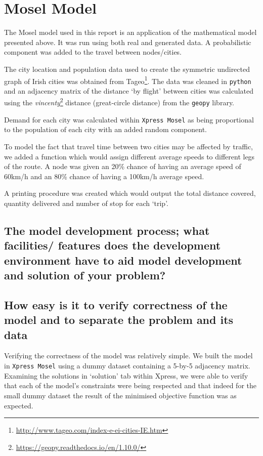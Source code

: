 \documentclass[a4paper,11pt]{article}
\begin{document}
\section{Mosel Model}

The Mosel model used in this report is an application of the mathematical model presented above. It was run using both real and generated data. A probabilistic component was added to the travel between nodes/cities.

The city location and population data used to create the symmetric undirected graph of Irish cities was obtained from Tageo\footnote{\url{http://www.tageo.com/index-e-ei-cities-IE.htm}}. The data was cleaned in \texttt{python} and an adjacency matrix of the distance `by flight' between cities was calculated using the \textit{vincenty}\footnote{\url{https://geopy.readthedocs.io/en/1.10.0/}} distance (great-circle distance) from the \texttt{geopy} library.

Demand for each city was calculated within \texttt{Xpress Mosel} as being proportional to the population of each city with an added random component. 

To model the fact that travel time between two cities may be affected by traffic, we added a function which would assign different average speeds to different legs of the route. A node was given an 20\% chance of having an average speed of 60km/h and an 80\% chance of having a 100km/h average speed.

A printing procedure was created which would output the total distance covered, quantity delivered and number of stop for each `trip'.




\subsection{The model development process; what facilities/ features does the development environment
have to aid model development and solution of your problem? }




\subsection{How easy is it to verify correctness of the model and to separate the problem and its data}
Verifying the correctness of the model was relatively simple. We built the model in \texttt{Xpress Mosel} using a dummy dataset containing a 5-by-5 adjacency matrix. Examining the solutions in `solution' tab within Xpress, we were able to verify that each of the model's constraints were being respected and that indeed for the small dummy dataset the result of the minimised objective function was as expected.
\end{document}
